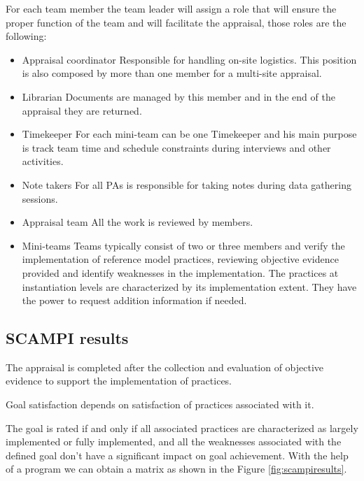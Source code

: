 For each team member the team leader will assign a role that will ensure the proper function of the team and will facilitate the appraisal, those roles are the following:
\begin{itemize}
	\item Appraisal coordinator
	\subitem Responsible for handling on-site logistics. This position is also composed by more than one member for a multi-site appraisal.
	\item Librarian
	\subitem Documents are managed by this member and in the end of the appraisal they are returned.
	\item Timekeeper
	\subitem For each mini-team can be one Timekeeper and his main purpose is track team time and schedule constraints during interviews and other activities.
	\item Note takers
	\subitem For all PAs is responsible for taking notes during data gathering sessions.
	\item Appraisal team
	\subitem All the work is reviewed by members.
	\item Mini-teams
	\subitem Teams typically consist of two or three members and verify the implementation of reference model practices, reviewing objective evidence provided and identify weaknesses in the implementation. The practices at instantiation levels are characterized by its implementation extent. They have the power to request addition information if needed. 
\end{itemize}

\subsection{SCAMPI results}

The appraisal is completed after the collection and evaluation of objective evidence to support the implementation of practices.

Goal satisfaction depends on satisfaction of practices associated with it.

The goal is rated if and only if all associated practices are characterized as largely implemented or fully implemented, and all the weaknesses associated with the defined goal don't have a significant impact on goal achievement.
With the help of a program we can obtain a matrix as shown in the Figure \ref{fig:scampiresults}.

% 


